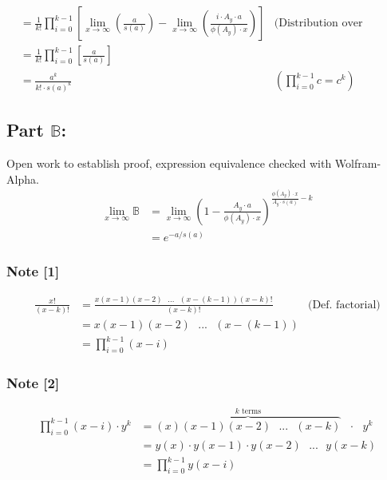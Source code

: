 \documentclass{article}
\theoremstyle{definition}
\begin{document}
\begin{align*}
                                  & = \frac{1}{k!} \prod_{i = 0}^{k-1} \left[  \lim_{x \to \infty} \left(   \frac{a}{ s(a)}\right) -  \lim_{x \to \infty}\left(\frac{i \cdot A_y \cdot a }{\phi(A_y) \cdot x} \right) \right]                         & \text{(Distribution over difference limit law)} \\
                                  & = \frac{1}{k!} \prod_{i = 0}^{k-1} \left[     \frac{a}{ s(a)} \right]                                                                                                                                                                                               \\
                                  & =\frac{a^k}{k! \cdot s(a)^k}                                                                                                                                                                                      & \left( \prod_{i = 0}^{k-1}c = c^k \right)
\end{align*}

\subsection*{Part $\mathbb{B}$:}
Open work to establish proof, expression equivalence checked with Wolfram-Alpha. 
\begin{align*}
    \lim_{x \to \infty} \mathbb{B} & = \lim_{x \to \infty}\left(1- \frac{A_y \cdot a}{\phi(A_y) \cdot x}\right)^{\frac{\phi(A_y) \cdot x}{A_y \cdot s(a)  } -k} \\
                                   & = e^{-a/s(a)}
\end{align*}

\subsubsection*{Note [1]}
\begin{align*}
    \frac{x!}{(x-k)!} & = \frac{x(x-1)(x-2) \text{ } ...\text{ } (x-(k-1))(x-k)!  }{(x-k)!} & \text{(Def. factorial)} \\
                      & = x(x-1)(x-2) \text{ } ...\text{ } (x-(k-1))                                                  \\
                      & = \prod_{i = 0}^{k-1}(x-i)
\end{align*}
\subsubsection*{Note [2]}\begin{align*}
    \prod_{i=0}^{k-1}(x-i) \cdot y^k & = \overbrace {(x)(x-1)(x-2) \text{ } ... \text{ } (x-k)}^{k \text{ terms}} \text{ } \cdot \text{ }y^k \\
                                     & = y(x) \cdot  y(x-1) \cdot y(x-2) \text{ } ... \text{ } y(x-k)                                        \\
                                     & = \prod_{i=0}^{k-1} y(x-i)
\end{align*}
\end{document}
